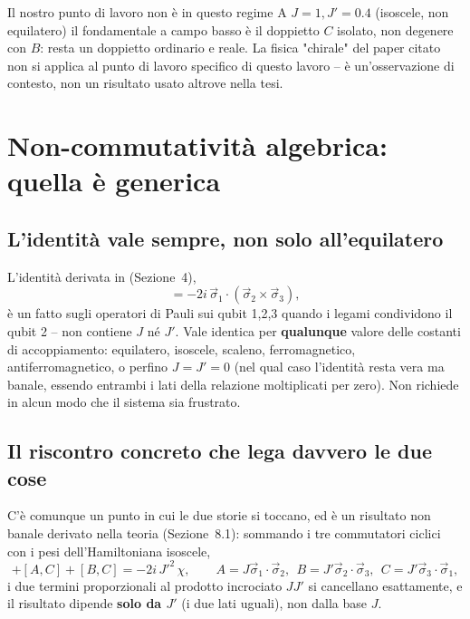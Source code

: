 \documentclass[11pt,a4paper]{article}
\begin{document}
\begin{warnbox}{Il nostro punto di lavoro non è in questo regime}
A $J{=}1,J'{=}0.4$ (isoscele, non equilatero) il fondamentale a campo
basso è il doppietto $C$ isolato, non degenere con $B$: resta un
doppietto ordinario e reale. La fisica "chirale" del paper citato non si
applica al punto di lavoro specifico di questo lavoro -- è un'osservazione
di contesto, non un risultato usato altrove nella tesi.
\end{warnbox}

\section{Non-commutatività algebrica: quella è generica}

\subsection{L'identità vale sempre, non solo all'equilatero}

L'identità derivata in
\texttt{}
(Sezione~4),
\begin{equation}
[\vec\sigma_1\cdot\vec\sigma_2,\,\vec\sigma_2\cdot\vec\sigma_3] = -2i\,\vec\sigma_1\cdot(\vec\sigma_2\times\vec\sigma_3),
\end{equation}
è un fatto sugli operatori di Pauli sui qubit 1,2,3 quando i legami
condividono il qubit 2 -- non contiene $J$ n\'e $J'$. Vale identica per
\textbf{qualunque} valore delle costanti di accoppiamento: equilatero,
isoscele, scaleno, ferromagnetico, antiferromagnetico, o perfino
$J=J'=0$ (nel qual caso l'identità resta vera ma banale, essendo entrambi
i lati della relazione moltiplicati per zero). Non richiede in alcun modo
che il sistema sia frustrato.

\subsection{Il riscontro concreto che lega davvero le due cose}

C'è comunque un punto in cui le due storie si toccano, ed è un risultato
non banale derivato nella teoria (Sezione~8.1): sommando i tre
commutatori ciclici con i pesi dell'Hamiltoniana isoscele,
\begin{equation}
[A,B]+[A,C]+[B,C] = -2i\,J'^2\,\chi, \qquad A=J\vec\sigma_1\!\cdot\!\vec\sigma_2,\ \ B=J'\vec\sigma_2\!\cdot\!\vec\sigma_3,\ \ C=J'\vec\sigma_3\!\cdot\!\vec\sigma_1,
\end{equation}
i due termini proporzionali al prodotto incrociato $JJ'$ si cancellano
esattamente, e il risultato dipende \textbf{solo da $J'$} (i due lati
uguali), non dalla base $J$.
\end{document}
